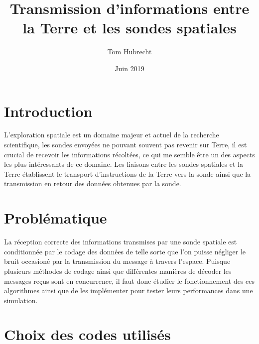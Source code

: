 \documentclass[12pt]{article}
\author{Tom Hubrecht}
\title{Transmission d'informations entre la Terre et les sondes spatiales}
\date{Juin 2019}
\begin{document}
\maketitle

\section{Introduction}
L'exploration spatiale est un domaine majeur et actuel de la recherche scientifique, les sondes envoyées ne pouvant souvent pas revenir sur Terre, il est crucial de recevoir les informations récoltées, ce qui me semble être un des aspects les plus intéressants de ce domaine. Les liaisons entre les sondes spatiales et la Terre établissent le transport d'instructions de la Terre vers la sonde ainsi que la transmission en retour des données obtenues par la sonde.


\section{Probl\'ematique}
La r\'eception correcte des informations transmises par une sonde spatiale est conditionn\'ee par le codage des donn\'ees de telle sorte que l'on puisse n\'egliger le bruit occasion\'e par la transmission du message \`a travers l'espace. Puisque plusieurs m\'ethodes de codage ainsi que diff\'erentes mani\`eres de d\'ecoder les messages re\c{c}us sont en concurrence, il faut donc \'etudier le fonctionnement des ces algorithmes ainsi que de les impl\'ementer pour tester leurs performances dans une simulation.

\section{Choix des codes utilis\'es}
\end{document}
